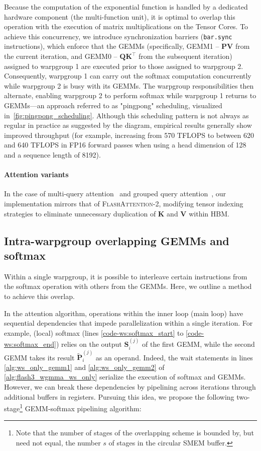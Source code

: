 Because the computation of the exponential function is handled by a dedicated hardware component (the multi-function unit), it is optimal to overlap this operation with the execution of matrix multiplications on the Tensor Cores. To achieve this concurrency, we introduce synchronization barriers (\texttt{bar.sync} instructions), which enforce that the GEMMs (specifically, GEMM1 -- $\mathbf{P} \mathbf{V}$ from the current iteration, and GEMM0 -- $\mathbf{Q} \mathbf{K}^\top$ from the subsequent iteration) assigned to warpgroup 1 are executed prior to those assigned to warpgroup 2. Consequently, warpgroup 1 can carry out the softmax computation concurrently while warpgroup 2 is busy with its GEMMs. The warpgroup responsibilities then alternate, enabling warpgroup 2 to perform softmax while warpgroup 1 returns to GEMMs—an approach referred to as "pingpong" scheduling, visualized in~\cref{fig:pingpong_scheduling}. Although this scheduling pattern is not always as regular in practice as suggested by the diagram, empirical results generally show improved throughput (for example, increasing from 570 TFLOPS to between 620 and 640 TFLOPS in FP16 forward passes when using a head dimension of 128 and a sequence length of 8192).

\paragraph{Attention variants} In the case of multi-query attention~\citep{shazeer2019fast} and grouped query attention~\citep{ainslie2023gqa}, our implementation mirrors that of \textsc{FlashAttention-2}, modifying tensor indexing strategies to eliminate unnecessary duplication of $\mathbf{K}$ and $\mathbf{V}$ within HBM.

\subsection{Intra-warpgroup overlapping GEMMs and softmax}

Within a single warpgroup, it is possible to interleave certain instructions from the softmax operation with others from the GEMMs. Here, we outline a method to achieve this overlap.

In the attention algorithm, operations within the inner loop (main loop) have sequential dependencies that impede parallelization within a single iteration. For example, (local) softmax (lines \ref{code-ws:softmax_start} to \ref{code-ws:softmax_end}) relies on the output $\mathbf{S}_i^{(j)}$ of the first GEMM, while the second GEMM takes its result $\widetilde{\mathbf{P}}_i^{(j)}$ as an operand. Indeed, the wait statements in lines \ref{alg:ws_only_gemm1} and \ref{alg:ws_only_gemm2} of \cref{alg:flash3_wgmma_ws_only} serialize the execution of softmax and GEMMs. However, we can break these dependencies by pipelining across iterations through additional buffers in registers. Pursuing this idea, we propose the following two-stage\footnote{Note that the number of stages of the overlapping scheme is bounded by, but need not equal, the number $s$ of stages in the circular SMEM buffer.} GEMM-softmax pipelining algorithm:

